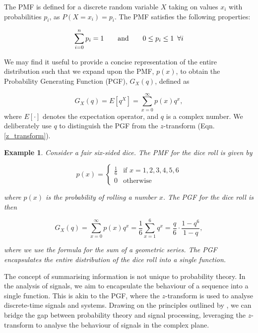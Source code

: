 \documentclass[a4paper]{report}
\newtheorem{example}{Example}
\begin{document}
The PMF is defined for a discrete random variable $X$ taking on values $x_i$ with probabilities $p_i$, as $P(X=x_i) = p_i$. The PMF satisfies the following properties:

\begin{equation}
    \sum_{i=0}^n p_i = 1 \hspace{2em}\text{and}\hspace{2em} 0 \leq p_i \leq 1 \hspace{0.5em}\forall i
\end{equation}

We may find it useful to provide a concise representation of the entire distribution such that we expand upon the PMF, $p(x)$, to obtain the Probability Generating Function (PGF), $G_X(q)$, defined as

\begin{equation}
	G_X(q) = E[q^X] = \sum^{\infty}_{x = 0} p(x)q^x,
\end{equation}
where $E[\cdot]$ denotes the expectation operator, and $q$ is a complex number. We deliberately use $q$ to distinguish the PGF from the $z$-transform (Eqn. \ref{z_transform}).

\begin{example}
    Consider a fair six-sided dice. The PMF for the dice roll is given by
    
    \begin{equation}
        p(x) = \begin{cases}
            \frac{1}{6} & \text{if } x = 1, 2, 3, 4, 5, 6 \\
            0 & \text{otherwise}
        \end{cases}
    \end{equation}

    where $p(x)$ is the probability of rolling a number $x$. The PGF for the dice roll is then

    \begin{equation}
        G_X(q) = \sum^{\infty}_{x = 0} p(x)q^x = \frac{1}{6} \sum^6_{x = 1} q^x = \frac{q}{6}\cdot \frac{1-q^6}{1-q},
    \end{equation}

    where we use the formula for the sum of a geometric series. The PGF encapsulates the entire distribution of the dice roll into a single function.
\end{example}

The concept of summarising information is not unique to probability theory. In the analysis of signals, we aim to encapsulate the behaviour of a sequence into a single function. This is akin to the PGF, where the $z$-transform is used to analyse discrete-time signals and systems. Drawing on the principles outlined by \citet{ross2014introduction}, we can bridge the gap between probability theory and signal processing, leveraging the $z$-transform to analyse the behaviour of signals in the complex plane.
\end{document}
